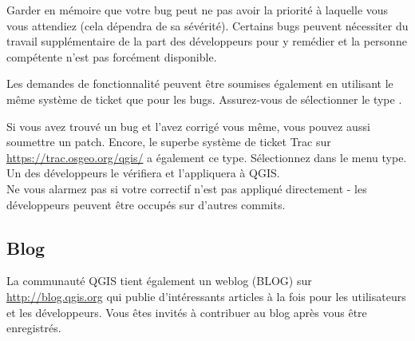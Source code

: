 Garder en mémoire que votre bug peut ne pas avoir la priorité à laquelle vous
vous attendiez (cela dépendra de sa sévérité). Certains bugs peuvent nécessiter du
travail supplémentaire de la part des développeurs pour y remédier et la personne
compétente n'est pas forcément disponible.

Les demandes de fonctionnalité peuvent être soumises également en utilisant le
même système de ticket que pour les bugs. Assurez-vous de sélectionner le type
.

Si vous avez trouvé un bug et l'avez corrigé vous même, vous pouvez
aussi soumettre un patch. Encore, le superbe système de ticket Trac sur
\url{https://trac.osgeo.org/qgis/} a également ce type. Sélectionnez
 dans le menu type. Un des développeurs le vérifiera et
l'appliquera à QGIS.\\
Ne vous alarmez pas si votre correctif n'est pas appliqué directement - les
développeurs peuvent être occupés sur d'autres commits.


\subsection{Blog}
La communauté QGIS tient également un weblog (BLOG) sur
\url{http://blog.qgis.org} qui publie d'intéressants articles à la fois pour les
utilisateurs et les développeurs. Vous êtes invités à contribuer au blog après
vous être enregistrés.


